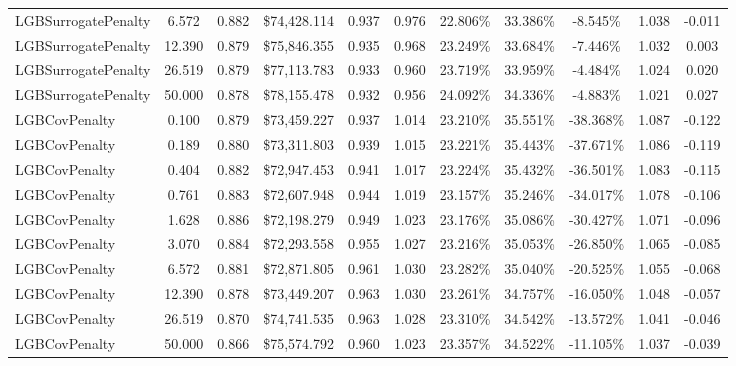\documentclass[12pt]{article}
\theoremstyle{plain}
\theoremstyle{definition}
\newcommand{\1}{\mathbf{1}}
\begin{document}
\begin{table}[!htbp]
{\begin{tabular}{lc|cc|cc|cc|ccc}
LGBSurrogatePenalty & 6.572 & 0.882 & \$74{,}428.114 & 0.937 & 0.976 & 22.806\% & 33.386\% & -8.545\% & 1.038 & -0.011 \\
LGBSurrogatePenalty & 12.390 & 0.879 & \$75{,}846.355 & 0.935 & 0.968 & 23.249\% & 33.684\% & -7.446\% & 1.032 & 0.003 \\
LGBSurrogatePenalty & 26.519 & 0.879 & \$77{,}113.783 & 0.933 & 0.960 & 23.719\% & 33.959\% & -4.484\% & 1.024 & 0.020 \\
LGBSurrogatePenalty & 50.000 & 0.878 & \$78{,}155.478 & 0.932 & 0.956 & 24.092\% & 34.336\% & -4.883\% & 1.021 & 0.027 \\
\midrule
LGBCovPenalty & 0.100 & 0.879 & \$73{,}459.227 & 0.937 & 1.014 & 23.210\% & 35.551\% & -38.368\% & 1.087 & -0.122 \\
LGBCovPenalty & 0.189 & 0.880 & \$73{,}311.803 & 0.939 & 1.015 & 23.221\% & 35.443\% & -37.671\% & 1.086 & -0.119 \\
LGBCovPenalty & 0.404 & 0.882 & \$72{,}947.453 & 0.941 & 1.017 & 23.224\% & 35.432\% & -36.501\% & 1.083 & -0.115 \\
LGBCovPenalty & 0.761 & 0.883 & \$72{,}607.948 & 0.944 & 1.019 & 23.157\% & 35.246\% & -34.017\% & 1.078 & -0.106 \\
LGBCovPenalty & 1.628 & 0.886 & \$72{,}198.279 & 0.949 & 1.023 & 23.176\% & 35.086\% & -30.427\% & 1.071 & -0.096 \\
LGBCovPenalty & 3.070 & 0.884 & \$72{,}293.558 & 0.955 & 1.027 & 23.216\% & 35.053\% & -26.850\% & 1.065 & -0.085 \\
LGBCovPenalty & 6.572 & 0.881 & \$72{,}871.805 & 0.961 & 1.030 & 23.282\% & 35.040\% & -20.525\% & 1.055 & -0.068 \\
LGBCovPenalty & 12.390 & 0.878 & \$73{,}449.207 & 0.963 & 1.030 & 23.261\% & 34.757\% & -16.050\% & 1.048 & -0.057 \\
LGBCovPenalty & 26.519 & 0.870 & \$74{,}741.535 & 0.963 & 1.028 & 23.310\% & 34.542\% & -13.572\% & 1.041 & -0.046 \\
LGBCovPenalty & 50.000 & 0.866 & \$75{,}574.792 & 0.960 & 1.023 & 23.357\% & 34.522\% & -11.105\% & 1.037 & -0.039 \\
\bottomrule
\end{tabular}}
\end{table}
\end{document}
